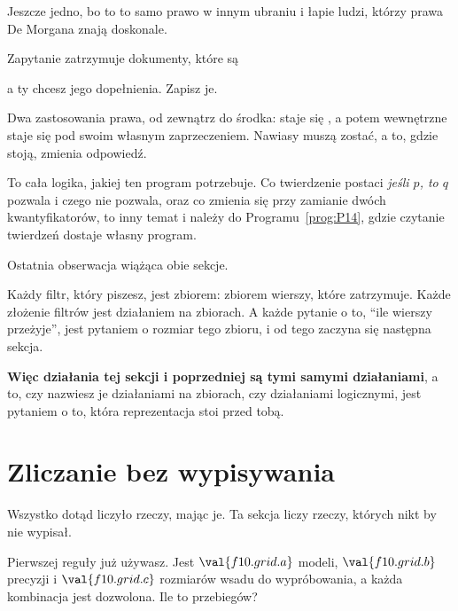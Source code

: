 \begin{fr}
Jeszcze jedno, bo to to samo prawo w innym ubraniu i łapie ludzi, którzy prawa
De Morgana znają doskonale.

Zapytanie zatrzymuje dokumenty, które są
\begin{center}\end{center}
a ty chcesz jego dopełnienia. Zapisz je.
\nextframe
\end{fr}

\begin{fr}
\begin{ansblock}
\end{ansblock}

Dwa zastosowania prawa, od zewnątrz do środka:  staje się ,
a potem wewnętrzne  staje się  pod swoim własnym
zaprzeczeniem. Nawiasy muszą zostać, a to, gdzie stoją, zmienia odpowiedź.

To cała logika, jakiej ten program potrzebuje. Co twierdzenie postaci
\emph{jeśli $p$, to $q$} pozwala i czego nie pozwala, oraz co zmienia się przy
zamianie dwóch kwantyfikatorów, to inny temat i należy do
Programu~\ref{prog:P14}, gdzie czytanie twierdzeń dostaje własny program.
\end{fr}

\begin{fr}
Ostatnia obserwacja wiążąca obie sekcje.

Każdy filtr, który piszesz, jest zbiorem: zbiorem wierszy, które zatrzymuje.
Każde złożenie filtrów jest działaniem na zbiorach. A każde pytanie o to,
\enquote{ile wierszy przeżyje}, jest pytaniem o rozmiar tego zbioru, i od tego
zaczyna się następna sekcja.

\textbf{Więc działania tej sekcji i poprzedniej są tymi samymi działaniami}, a
to, czy nazwiesz je działaniami na zbiorach, czy działaniami logicznymi, jest
pytaniem o to, która reprezentacja stoi przed tobą.
\end{fr}

\section{Zliczanie bez wypisywania}
\label{sec:F10-counting}

\begin{fr}
Wszystko dotąd liczyło rzeczy, mając je. Ta sekcja liczy rzeczy, których nikt
by nie wypisał.

Pierwszej reguły już używasz. Jest $\val{f10.grid.a}$ modeli,
$\val{f10.grid.b}$ precyzji i $\val{f10.grid.c}$ rozmiarów wsadu do
wypróbowania, a każda kombinacja jest dozwolona. Ile to przebiegów?
\nextframe
\end{fr}

